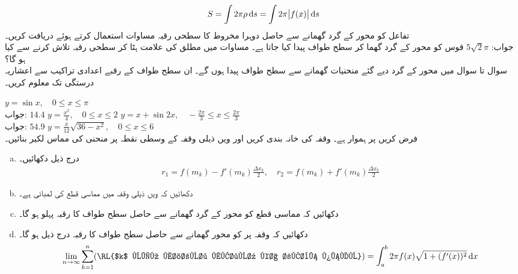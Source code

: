 \begin{align}\label{مساوات_تکمل_استعمال_سطحی_رقبہ_ٹ}
S=\int 2\pi \rho \dif s=\int 2\pi \abs{f(x)}\dif s
\end{align}
تفاعل   کو محور  کے گرد گھمانے سے حاصل دوہرا مخروط کا سطحی رقبہ مساوات  استعمال کرتے ہوئے  دریافت کریں۔\\
جواب:\quad
$5\sqrt{2}\pi$
قوس  کو محور  کے گرد گھما کر سطح طواف پیدا کیا جاتا ہے۔ مساوات  میں مطلق کی علامت ہٹا کر سطحی رقبہ تلاش کرنے سے کیا ہو گا؟
\\
سوال  تا سوال  میں محور  کے گرد دیے گئے منحنیات گھمانے سے سطح طواف پیدا ہوں گے۔ ان سطح طواف کے رقبے اعدادی تراکیب سے  اعشاریہ درستگی تک معلوم کریں۔

$y=\sin x,\quad 0\le x\le \pi$\\
جواب:\quad
$14.4$
$y=\tfrac{x^2}{4},\quad 0\le x\le 2$
$y=x+\sin 2x,\quad -\tfrac{2\pi}{3}\le x\le \tfrac{2\pi}{3}$\\
جواب:\quad
$54.9$
$y=\tfrac{x}{12}\sqrt{36-x^2},\quad 0\le x\le 6$
\\
فرض کریں  پر  ہموار ہے۔ وقفہ  کی خانہ بندی کریں اور  ویں ذیلی وقفہ  کے وسطی نقطہ  پر منحنی کی مماس لکیر بنائیں۔
\begin{enumerate}[a.]
\item
درج ذیل دکھائیں۔
\begin{align*}
r_1=f(m_k)-f'(m_k)\frac{\Delta x_k}{2},\quad r_2=f(m_k)+f'(m_k)\frac{\Delta x_k}{2}
\end{align*}
\item
دکھائیں کہ  ویں ذیلی وقفہ میں مماسی قطع کی لمبائی  ہے۔
\item
دکھائیں کہ مماسی قطع کو محور  کے گرد گھمانے سے حاصل سطح طواف کا رقبہ پہلو  ہو گا۔
\item
دکھائیں کہ وقفہ  پر  کو محور  گھمانے سے حاصل سطح طواف کا رقبہ درج ذیل ہو گا۔
\begin{align*}
\lim_{n\to \infty}\sum_{k=1}^n(\text{\RL{$k$ ویں مخروط مقطوع کا رقبہ پہلو}})=\int_a^b2\pi f(x)\sqrt{1+(f'(x))^2}\dif x
\end{align*}
\end{enumerate}

